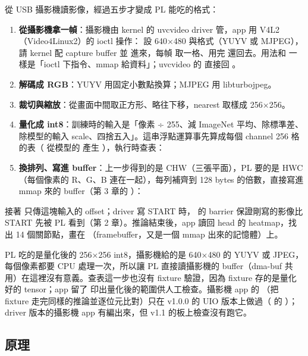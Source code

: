  從 USB 攝影機讀影像，經過五步才變成 PL 能吃的格式：
\begin{enumerate}
\item \textbf{從攝影機拿一幀}：攝影機由 kernel 的 uvcvideo driver 管，app 用 V4L2（Video4Linux2）的 ioctl 操作： 設 640×480 與格式（YUYV 或 MJPEG）， 請 kernel 配 capture buffer 並  進來，每幀  取一格、用完  還回去。用法和  一樣是「ioctl 下指令、mmap 給資料」；uvcvideo 的  直接回 。
\item \textbf{解碼成 RGB}：YUYV 用固定小數點換算；MJPEG 用 libturbojpeg。
\item \textbf{裁切與縮放}：從畫面中間取正方形、略往下移，nearest 取樣成 256×256。
\item \textbf{量化成 int8}：訓練時的輸入是「像素 ÷ 255、減 ImageNet 平均、除標準差、除模型的輸入 scale、四捨五入」。這串浮點運算事先算成每個 channel 256 格的表（ 從模型的  產生 ），執行時查表：
\item \textbf{換排列、寫進 buffer}：上一步得到的是 CHW（三張平面），PL 要的是 HWC（每個像素的 R、G、B 連在一起），每列補齊到 128 bytes 的倍數，直接寫進 mmap 來的 buffer（第 3 章的 ）：
\end{enumerate}

接著  只傳這塊輸入的 offset；driver 寫 START 時， 的 barrier 保證剛寫的影像比 START 先被 PL 看到（第 2 章）。推論結束後，app 讀回 head 的 heatmap，找出 14 個關節點，畫在 （framebuffer，又是一個 mmap 出來的記憶體）上。

PL 吃的是量化後的 256×256 int8，攝影機給的是 640×480 的 YUYV 或 JPEG，每個像素都要 CPU 處理一次，所以讓 PL 直接讀攝影機的 buffer（dma-buf 共用）在這裡沒有意義。查表這一步也沒有 fixture 驗證，因為 fixture 存的是量化好的 tensor；app 留了  印出量化後的範圍供人工檢查。攝影機 app 的 （把 fixture 走完同樣的推論並逐位元比對）只在 v1.0.0 的 UIO 版本上做過（ 的 ）；driver 版本的攝影機 app 有編出來，但 v1.1 的板上檢查沒有跑它。

\subsection{原理}

